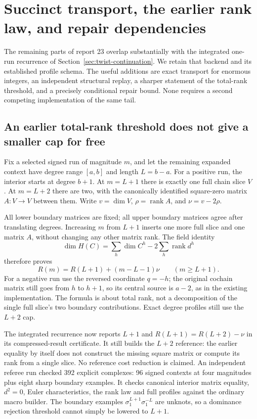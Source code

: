 \section{Succinct transport, the earlier rank law, and repair dependencies}
\label{sec:symbolic-runs}

The remaining parts of report 23 overlap substantially with the integrated
one-run recurrence of Section~\ref{sec:twist-continuation}.  We retain that
backend and its established profile schema.  The useful additions are exact
transport for enormous integers, an independent structural replay, a sharper
statement of the total-rank threshold, and a precisely conditional repair
bound.  None requires a second competing implementation of the same tail.

\subsection{An earlier total-rank threshold does not give a smaller cap for free}
Fix a selected signed run of magnitude $m$, and let the remaining expanded
context have degree range $[a,b]$ and length $L=b-a$.
For a positive run, the interior starts at degree $b+1$.  At $m=L+1$
there is exactly one full chain slice $V$.  At $m=L+2$ there are two,
with the canonically identified square-zero matrix $A:V\to V$ between them.
Write $v=\dim V$, $\rho=\operatorname{rank}A$, and $\nu=v-2\rho$.

All lower boundary matrices are fixed; all upper boundary matrices agree
after translating degrees.  Increasing $m$ from $L+1$ inserts one more
full slice and one matrix $A$, without changing any other matrix rank.
The field identity
\[
 \dim H(C)=\sum_h\dim C^h-2\sum_h\operatorname{rank}d^h
\]
therefore proves
\[
 R(m)=R(L+1)+(m-L-1)\nu\qquad(m\ge L+1).
\]
For a negative run use the reversed coordinate $q=-h$; the original
cochain matrix still goes from $h$ to $h+1$, so its central source is
$a-2$, as in the existing implementation.  The formula is about total
rank, not a decomposition of the single full slice's two boundary
contributions.  Exact degree profiles still use the $L+2$ cap.

The integrated recurrence now reports $L+1$ and
$R(L+1)=R(L+2)-\nu$ in its compressed-result certificate.  It still builds
the $L+2$ reference: the earlier equality by itself does not construct the
missing square matrix or compute its rank from a single slice.  No reference
cost reduction is claimed.  An independent referee run checked 392 explicit
complexes: 96 signed contexts at four magnitudes plus eight sharp boundary
examples.  It checks canonical interior matrix equality, $d^2=0$, Euler
characteristics, the rank law and full profiles against the ordinary macro
builder.  The boundary examples $\sigma_1^{L+1}\sigma_1^{-L}$ are unknots,
so a dominance rejection threshold cannot simply be lowered to $L+1$.

